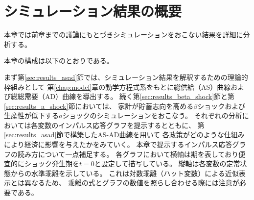 
\section{シミュレーション結果の概要}
\label{sec:results_overview}

本章では前章までの議論にもとづきシミュレーションをおこない結果を詳細に分析する。

本章の構成は以下のとおりである。

まず第\ref{sec:results_asad}節では、シミュレーション結果を解釈するための理論的枠組みとして
第\ref{chap:model}章の動学方程式系をもとに総供給（AS）曲線および総総需要（AD）曲線を導出する。
続く第\ref{sec:results_beta_shock}節と第\ref{sec:results_a_shock}節においては、
家計が貯蓄志向を高める\(\beta\)ショックおよび
生産性が低下する\(a\)ショックのシミュレーションをおこなう。
それぞれの分析においては各変数のインパルス応答グラフを提示するとともに、
第\ref{sec:results_asad}節で構築したAS-AD曲線を用いて
各政策がどのような仕組みにより経済に影響を与えたかをみていく。
本章で提示するインパルス応答グラフの読み方について一点補足する。
各グラフにおいて横軸は期を表しており便宜的にショック発生期を\(t=0\)と設定して描写している。
縦軸は各変数の定常状態からの水準乖離を示している。
これは対数乖離（ハット変数）による近似表示とは異なるため、
乖離の式とグラフの数値を照らし合わせる際には注意が必要である。